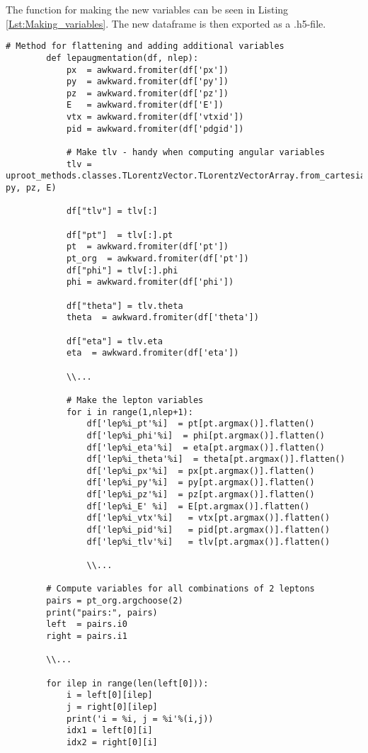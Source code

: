 \documentclass[a4paper, american, 12pt]{report}
\begin{document}
	The function for making the new variables can be seen in Listing \ref{Lst:Making_variables}. The new dataframe is then exported as a .h5-file. 
	\begin{lstlisting}[caption=Making new variables., label=Lst:Making_variables]
		# Method for flattening and adding additional variables
		def lepaugmentation(df, nlep):
			px  = awkward.fromiter(df['px'])
			py  = awkward.fromiter(df['py'])
			pz  = awkward.fromiter(df['pz'])
			E   = awkward.fromiter(df['E'])
			vtx = awkward.fromiter(df['vtxid'])
			pid = awkward.fromiter(df['pdgid'])
		
			# Make tlv - handy when computing angular variables
			tlv = uproot_methods.classes.TLorentzVector.TLorentzVectorArray.from_cartesian(px, py, pz, E)
		
			df["tlv"] = tlv[:]
		
			df["pt"]  = tlv[:].pt
			pt  = awkward.fromiter(df['pt'])
			pt_org  = awkward.fromiter(df['pt'])
			df["phi"] = tlv[:].phi
			phi = awkward.fromiter(df['phi'])
		
			df["theta"] = tlv.theta
			theta  = awkward.fromiter(df['theta'])
		
			df["eta"] = tlv.eta
			eta  = awkward.fromiter(df['eta'])
		
			\\...
		
			# Make the lepton variables
			for i in range(1,nlep+1):
				df['lep%i_pt'%i]  = pt[pt.argmax()].flatten()
				df['lep%i_phi'%i]  = phi[pt.argmax()].flatten()
				df['lep%i_eta'%i]  = eta[pt.argmax()].flatten()
				df['lep%i_theta'%i]  = theta[pt.argmax()].flatten()
				df['lep%i_px'%i]  = px[pt.argmax()].flatten()
				df['lep%i_py'%i]  = py[pt.argmax()].flatten()
				df['lep%i_pz'%i]  = pz[pt.argmax()].flatten()
				df['lep%i_E' %i]  = E[pt.argmax()].flatten()
				df['lep%i_vtx'%i]   = vtx[pt.argmax()].flatten()
				df['lep%i_pid'%i]   = pid[pt.argmax()].flatten()
				df['lep%i_tlv'%i]   = tlv[pt.argmax()].flatten()
		
				\\...
		
		# Compute variables for all combinations of 2 leptons
		pairs = pt_org.argchoose(2)
		print("pairs:", pairs)
		left  = pairs.i0
		right = pairs.i1
		
		\\...
		
		for ilep in range(len(left[0])):
			i = left[0][ilep]
			j = right[0][ilep]
			print('i = %i, j = %i'%(i,j))
			idx1 = left[0][i]
			idx2 = right[0][i]
		

\end{lstlisting}
\end{document}
